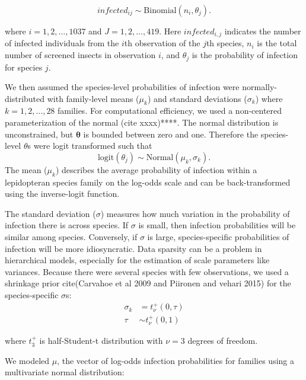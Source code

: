 \documentclass[12pt]{article}
\begin{document}
\begin{equation}
	infected_{ij} \sim \mathrm{Binomial}(n_{i}, \theta_{j}).
\end{equation}

where $i = 1, 2, \ldots, 1037$ and $J = 1, 2, \ldots, 419$. Here $infected_{i,j}$ indicates the number of infected individuals from the $i$th observation of the $j$th species,  $n_{i}$ is the total number of screened insects in observation $i$, and $\theta_{j}$ is the probability of infection for species $j$. 

	We then assumed the species-level probabilities of infection were normally-distributed with family-level means ($\mu_{k}$) and standard deviations ($\sigma_{k}$) where $k = 1, 2, \ldots, 28$ families. For computational efficiency, we used a non-centered parameterization of the normal (cite xxxx)****. The normal distribution is unconstrained, but $\mathbf{\theta}$ is bounded between zero and one. Therefore the species-level $\theta$s were logit transformed such that  
%
%
	\begin{equation}    
		\mathrm{logit} (\theta_{j}) \sim \mathrm{Normal}(\mu_{k}, \sigma_{k}).
	\end{equation}
The mean ($\mu_{k}$) describes the average probability of infection within a lepidopteran species family on the log-odds scale and can be back-transformed using the inverse-logit function. 

The standard deviation ($\sigma$) measures how much variation in the probability of infection there is across species. If $\sigma$ is small, then infection probabilities will be similar among species. Conversely, if $\sigma$ is large, species-specific probabilities of infection will be more idiosyncratic. Data sparsity can be a problem in hierarchical models, especially for the estimation of scale parameters like variances. Because there were several species with few observations, we used a shrinkage prior cite(Carvahoe et al 2009 and Piironen and vehari 2015)%
for the species-specific $\sigma$s: 
	\begin{align}
		\sigma_{k} 	&= 	 	t_{\nu}^{+}(0,\tau) \nonumber \\
        \tau		&\sim	t_{\nu}^{+}(0,1)     
	\end{align}

where $t_{3}^{+}$ is half-Student-t distribution with $\nu=3$ degrees of freedom. 

We modeled $\mu$, the vector of log-odds infection probabilities for families using a multivariate normal distribution:
\end{document}
